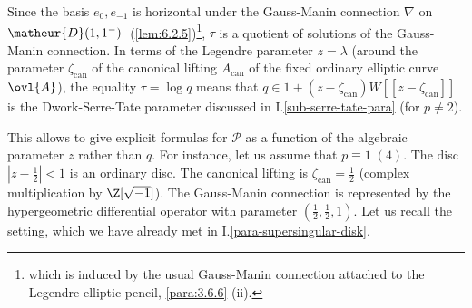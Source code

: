 \begin{para}\label{para:6.3.2} Since the basis $e_0,e_{-1}$ is horizontal
 under the Gauss-Manin connection $\nabla$ on $\matheur{D}(1,1^-)\;$ 
 (\ref{lem:6.2.5})\footnote{which is induced by the usual Gauss-Manin
 connection attached to the Legendre elliptic pencil, \cf
 \ref{para:3.6.6} (ii).}, $\tau$ is a quotient 
 of solutions of the Gauss-Manin connection. In terms of the Legendre
 parameter $z=\lambda$ (around the parameter $\zeta_{\mathrm{can}}$ of the
 canonical lifting $A_{\mathrm{can}}$ of the fixed ordinary elliptic curve
 $\ovl{A}$), the equality $\tau = \log q$ means that $q\in
 1+(z-\zeta_{\mathrm{can}})W[[z-\zeta_{\mathrm{can}}]]$ is the
 Dwork-Serre-Tate parameter 
 discussed in I.\ref{sub-serre-tate-para} (for $p\neq 2$).


 This allows to give explicit formulas for $\mathcal{P}$ as a function
 of the algebraic parameter $z$ rather than $q$. For instance, let us
 assume that $p\equiv 1\;(4)$. The disc $| z-\frac{1}{2}| <1$ is
 an ordinary disc. The canonical lifting is $\zeta_{\mathrm{can}}=\frac{1}{2}$
 (complex multiplication by $\Z[\sqrt{-1}]$).  The Gauss-Manin
 connection is represented by the hypergeometric differential operator
 with parameter $(\frac{1}{2},\frac{1}{2},1)$.  Let us recall the
 setting, which we have already met in I.\ref{para-supersingular-disk}.


\end{para}
